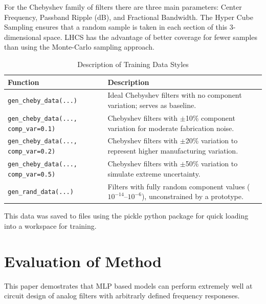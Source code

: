 \documentclass[10pt,conference]{IEEEtran}
\begin{document}
For the Chebyshev family of filters there are three main parameters: Center Frequency, Passband Ripple (dB), and Fractional Bandwidth. The Hyper Cube Sampling ensures that a random sample is taken in each section of this 3-dimensional space. LHCS has the advantage of better coverage for fewer samples than using the Monte-Carlo sampling approach.

\begin{table}[!ht]
\small %
\centering
\caption{Description of Training Data Styles}
\begin{tabular}{@{}p{3.8cm}p{4.2cm}@{}}
\toprule
\textbf{Function} & \textbf{Description} \\ \midrule
\texttt{gen\_cheby\_data(...)} & Ideal Chebyshev filters with no component variation; serves as baseline. \\
\texttt{gen\_cheby\_data(..., comp\_var=0.1)} & Chebyshev filters with $\pm$10\% component variation for moderate fabrication noise. \\
\texttt{gen\_cheby\_data(..., comp\_var=0.2)} & Chebyshev filters with $\pm$20\% variation to represent higher manufacturing variation. \\
\texttt{gen\_cheby\_data(..., comp\_var=0.5)} & Chebyshev filters with $\pm$50\% variation to simulate extreme uncertainty. \\
\texttt{gen\_rand\_data(...)} & Filters with fully random component values ($10^{-14}$–$10^{-6}$), unconstrained by a prototype. \\
\bottomrule
\end{tabular}
\label{tab:training_data_styles}
\end{table}


This data was saved to files using the pickle python package for quick loading into a workspace for training.





\section{Evaluation of Method}

This paper demostrates that MLP based models can perform extremely well at circuit design of analog filters with arbitrarly defined frequency responeses. 





\end{document}
